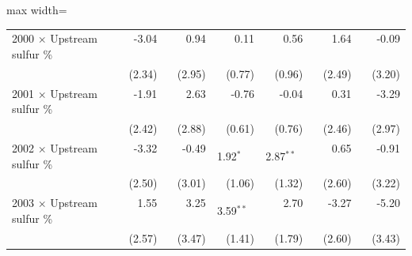 \begin{table}[htbp]
{\begin{adjustbox}{max width=\linewidth}
\begin{tabular}{lrrrrrr}
2000 $\times$ Upstream sulfur \% & \phantom{(}-3.04$^{\phantom{*}\phantom{*}\phantom{*}}$ & \phantom{(}\phantom{-}0.94$^{\phantom{*}\phantom{*}\phantom{*}}$ & \phantom{(}\phantom{-}0.11$^{\phantom{*}\phantom{*}\phantom{*}}$ & \phantom{(}\phantom{-}0.56$^{\phantom{*}\phantom{*}\phantom{*}}$ & \phantom{(}\phantom{-}1.64$^{\phantom{*}\phantom{*}\phantom{*}}$ & \phantom{(}-0.09$^{\phantom{*}\phantom{*}\phantom{*}}$ \\
 & (\phantom{-}2.34)\phantom{$^{***}$} & (\phantom{-}2.95)\phantom{$^{***}$} & (\phantom{-}0.77)\phantom{$^{***}$} & (\phantom{-}0.96)\phantom{$^{***}$} & (\phantom{-}2.49)\phantom{$^{***}$} & (\phantom{-}3.20)\phantom{$^{***}$} \\
2001 $\times$ Upstream sulfur \% & \phantom{(}-1.91$^{\phantom{*}\phantom{*}\phantom{*}}$ & \phantom{(}\phantom{-}2.63$^{\phantom{*}\phantom{*}\phantom{*}}$ & \phantom{(}-0.76$^{\phantom{*}\phantom{*}\phantom{*}}$ & \phantom{(}-0.04$^{\phantom{*}\phantom{*}\phantom{*}}$ & \phantom{(}\phantom{-}0.31$^{\phantom{*}\phantom{*}\phantom{*}}$ & \phantom{(}-3.29$^{\phantom{*}\phantom{*}\phantom{*}}$ \\
 & (\phantom{-}2.42)\phantom{$^{***}$} & (\phantom{-}2.88)\phantom{$^{***}$} & (\phantom{-}0.61)\phantom{$^{***}$} & (\phantom{-}0.76)\phantom{$^{***}$} & (\phantom{-}2.46)\phantom{$^{***}$} & (\phantom{-}2.97)\phantom{$^{***}$} \\
2002 $\times$ Upstream sulfur \% & \phantom{(}-3.32$^{\phantom{*}\phantom{*}\phantom{*}}$ & \phantom{(}-0.49$^{\phantom{*}\phantom{*}\phantom{*}}$ & \phantom{(}\phantom{-}1.92$^{*\phantom{*}\phantom{*}}$ & \phantom{(}\phantom{-}2.87$^{**\phantom{*}}$ & \phantom{(}\phantom{-}0.65$^{\phantom{*}\phantom{*}\phantom{*}}$ & \phantom{(}-0.91$^{\phantom{*}\phantom{*}\phantom{*}}$ \\
 & (\phantom{-}2.50)\phantom{$^{***}$} & (\phantom{-}3.01)\phantom{$^{***}$} & (\phantom{-}1.06)\phantom{$^{***}$} & (\phantom{-}1.32)\phantom{$^{***}$} & (\phantom{-}2.60)\phantom{$^{***}$} & (\phantom{-}3.22)\phantom{$^{***}$} \\
2003 $\times$ Upstream sulfur \% & \phantom{(}\phantom{-}1.55$^{\phantom{*}\phantom{*}\phantom{*}}$ & \phantom{(}\phantom{-}3.25$^{\phantom{*}\phantom{*}\phantom{*}}$ & \phantom{(}\phantom{-}3.59$^{**\phantom{*}}$ & \phantom{(}\phantom{-}2.70$^{\phantom{*}\phantom{*}\phantom{*}}$ & \phantom{(}-3.27$^{\phantom{*}\phantom{*}\phantom{*}}$ & \phantom{(}-5.20$^{\phantom{*}\phantom{*}\phantom{*}}$ \\
 & (\phantom{-}2.57)\phantom{$^{***}$} & (\phantom{-}3.47)\phantom{$^{***}$} & (\phantom{-}1.41)\phantom{$^{***}$} & (\phantom{-}1.79)\phantom{$^{***}$} & (\phantom{-}2.60)\phantom{$^{***}$} & (\phantom{-}3.43)\phantom{$^{***}$} \\

\end{tabular}
\end{adjustbox}}
\end{table}

